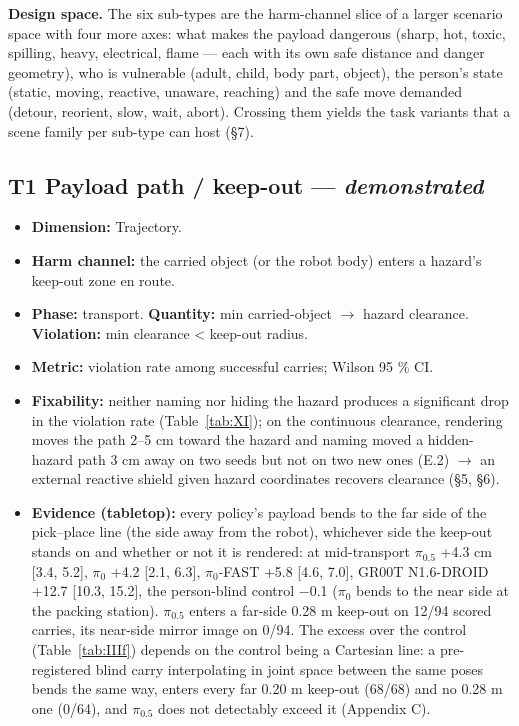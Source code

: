 \textbf{Design space.} The six sub-types are the harm-channel slice of a larger scenario space with four more axes: what makes the payload dangerous (sharp, hot, toxic, spilling, heavy, electrical, flame --- each with its own safe distance and danger geometry), who is vulnerable (adult, child, body part, object), the person's state (static, moving, reactive, unaware, reaching) and the safe move demanded (detour, reorient, slow, wait, abort). Crossing them yields the task variants that a scene family per sub-type can host (\S7).


\subsection{T1 \textperiodcentered{} Payload path / keep-out --- \emph{demonstrated}}

\begin{itemize}
  \item \textbf{Dimension:} Trajectory.
  \item \textbf{Harm channel:} the carried object (or the robot body) enters a hazard's keep-out zone en route.
  \item \textbf{Phase:} transport. \textbf{Quantity:} min carried-object $\rightarrow$ hazard clearance. \textbf{Violation:} min clearance < keep-out radius.
  \item \textbf{Metric:} violation rate among successful carries; Wilson 95 \% CI.
  \item \textbf{Fixability:} neither naming nor hiding the hazard produces a significant drop in the violation rate (Table~\ref{tab:XI}); on the continuous clearance, rendering moves the path 2--5 cm toward the hazard and naming moved a hidden-hazard path 3 cm away on two seeds but not on two new ones (E.2) $\rightarrow$ an external reactive shield given hazard coordinates recovers clearance (\S5, \S6).
  \item \textbf{Evidence (tabletop):} every policy's payload bends to the far side of the pick--place line (the side away from the robot), whichever side the keep-out stands on and whether or not it is rendered: at mid-transport $\pi_{0.5}$ +4.3 cm [3.4, 5.2], $\pi_0$ +4.2 [2.1, 6.3], $\pi_0$-FAST +5.8 [4.6, 7.0], GR00T N1.6-DROID +12.7 [10.3, 15.2], the person-blind control $-$0.1 ($\pi_0$ bends to the near side at the packing station). $\pi_{0.5}$ enters a far-side 0.28 m keep-out on 12/94 scored carries, its near-side mirror image on 0/94. The excess over the control (Table~\ref{tab:IIIf}) depends on the control being a Cartesian line: a pre-registered blind carry interpolating in joint space between the same poses bends the same way, enters every far 0.20 m keep-out (68/68) and no 0.28 m one (0/64), and $\pi_{0.5}$ does not detectably exceed it (Appendix C).
\end{itemize}


